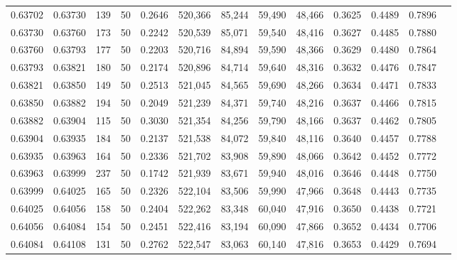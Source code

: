 \begin{tabular}{rrrrrrrrrrrrr}
0.63702 & 0.63730 &   139 &  50 &                                     0.2646 & 520,366 &  85,244 &  59,490 &  48,466 & 0.3625 & 0.4489 & 0.7896 \\
0.63730 & 0.63760 &   173 &  50 &                                     0.2242 & 520,539 &  85,071 &  59,540 &  48,416 & 0.3627 & 0.4485 & 0.7880 \\
0.63760 & 0.63793 &   177 &  50 &                                     0.2203 & 520,716 &  84,894 &  59,590 &  48,366 & 0.3629 & 0.4480 & 0.7864 \\
0.63793 & 0.63821 &   180 &  50 &                                     0.2174 & 520,896 &  84,714 &  59,640 &  48,316 & 0.3632 & 0.4476 & 0.7847 \\
0.63821 & 0.63850 &   149 &  50 &                                     0.2513 & 521,045 &  84,565 &  59,690 &  48,266 & 0.3634 & 0.4471 & 0.7833 \\
0.63850 & 0.63882 &   194 &  50 &                                     0.2049 & 521,239 &  84,371 &  59,740 &  48,216 & 0.3637 & 0.4466 & 0.7815 \\
0.63882 & 0.63904 &   115 &  50 &                                     0.3030 & 521,354 &  84,256 &  59,790 &  48,166 & 0.3637 & 0.4462 & 0.7805 \\
0.63904 & 0.63935 &   184 &  50 &                                     0.2137 & 521,538 &  84,072 &  59,840 &  48,116 & 0.3640 & 0.4457 & 0.7788 \\
0.63935 & 0.63963 &   164 &  50 &                                     0.2336 & 521,702 &  83,908 &  59,890 &  48,066 & 0.3642 & 0.4452 & 0.7772 \\
0.63963 & 0.63999 &   237 &  50 &                                     0.1742 & 521,939 &  83,671 &  59,940 &  48,016 & 0.3646 & 0.4448 & 0.7750 \\
0.63999 & 0.64025 &   165 &  50 &                                     0.2326 & 522,104 &  83,506 &  59,990 &  47,966 & 0.3648 & 0.4443 & 0.7735 \\
0.64025 & 0.64056 &   158 &  50 &                                     0.2404 & 522,262 &  83,348 &  60,040 &  47,916 & 0.3650 & 0.4438 & 0.7721 \\
0.64056 & 0.64084 &   154 &  50 &                                     0.2451 & 522,416 &  83,194 &  60,090 &  47,866 & 0.3652 & 0.4434 & 0.7706 \\
0.64084 & 0.64108 &   131 &  50 &                                     0.2762 & 522,547 &  83,063 &  60,140 &  47,816 & 0.3653 & 0.4429 & 0.7694 \\

\end{tabular}
